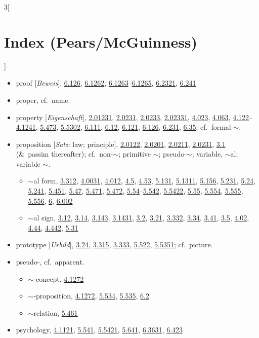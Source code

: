 \documentclass[oneside,openany,12pt]{book}
\newcommand{\indexentry}[1]{\item #1}
\newcommand{\indexsubentry}[1]{\begin{itemize} \item #1 \end{itemize}}
\newcommand{\indexref}[1]{\hyperlink{prop#1}{#1}}
\begin{document}
\begin{multicols}{3}[\section*{Index (Pears/McGuinness)}]
\begin{itemize}
   \indexsubentry{method of $\sim$ion, \indexref{3.11}}

\indexentry{proof [\textit{Beweis}], \indexref{6.126}, \indexref{6.1262}, \indexref{6.1263}--\indexref{6.1265}, \indexref{6.2321}, \indexref{6.241}}

\indexentry{proper, cf.\ name.}

\indexentry{property [\textit{Eigenschaft}], \indexref{2.01231}, \indexref{2.0231}, \indexref{2.0233}, \indexref{2.02331}, \indexref{4.023}, \indexref{4.063}, \indexref{4.122}--\indexref{4.1241}, \indexref{5.473}, \indexref{5.5302}, \indexref{6.111}, \indexref{6.12}, \indexref{6.121}, \indexref{6.126}, \indexref{6.231}, \indexref{6.35}; cf.\ formal $\sim$.}

\indexentry{proposition [\textit{Satz}: law; principle], \indexref{2.0122}, \indexref{2.0201}, \indexref{2.0211}, \indexref{2.0231}, \indexref{3.1} (\&\ passim thereafter); cf.\ non-$\sim$; primitive $\sim$; pseudo-$\sim$; variable, $\sim$al; variable $\sim$.}

   \indexsubentry{$\sim$al form, \indexref{3.312}, \indexref{4.0031}, \indexref{4.012}, \indexref{4.5}, \indexref{4.53}, \indexref{5.131}, \indexref{5.1311}, \indexref{5.156}, \indexref{5.231}, \indexref{5.24}, \indexref{5.241}, \indexref{5.451}, \indexref{5.47}, \indexref{5.471}, \indexref{5.472}, \indexref{5.54}--\indexref{5.542}, \indexref{5.5422}, \indexref{5.55}, \indexref{5.554}, \indexref{5.555}, \indexref{5.556}, \indexref{6}, \indexref{6.002}}

   \indexsubentry{$\sim$al sign, \indexref{3.12}, \indexref{3.14}, \indexref{3.143}, \indexref{3.1431}, \indexref{3.2}, \indexref{3.21}, \indexref{3.332}, \indexref{3.34}, \indexref{3.41}, \indexref{3.5}, \indexref{4.02}, \indexref{4.44}, \indexref{4.442}, \indexref{5.31}}

\indexentry{prototype [\textit{Urbild}], \indexref{3.24}, \indexref{3.315}, \indexref{3.333}, \indexref{5.522}, \indexref{5.5351}; cf.\ picture.}

\indexentry{pseudo-, cf.\ apparent.}

   \indexsubentry{$\sim$-concept, \indexref{4.1272}}

   \indexsubentry{$\sim$-proposition, \indexref{4.1272}, \indexref{5.534}, \indexref{5.535}, \indexref{6.2}}

   \indexsubentry{$\sim$relation, \indexref{5.461}}

\indexentry{psychology, \indexref{4.1121}, \indexref{5.541}, \indexref{5.5421}, \indexref{5.641}, \indexref{6.3631}, \indexref{6.423}}


\end{itemize}
\end{multicols}
\end{document}
